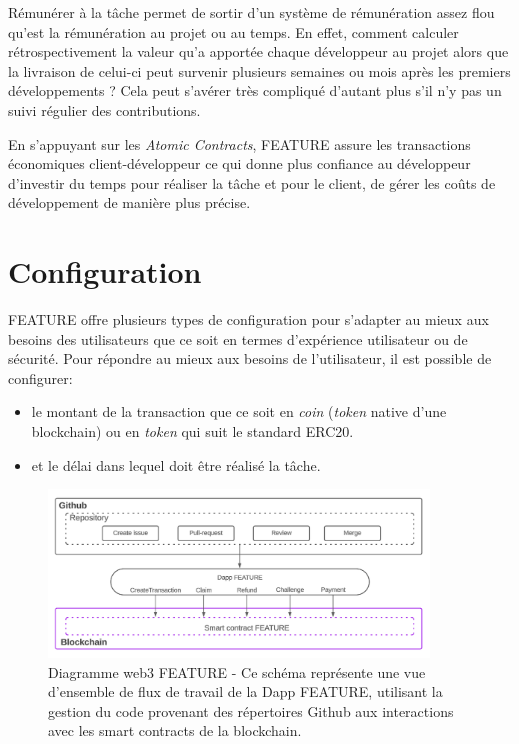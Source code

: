\documentclass[
	a4paper, %
	10pt, %
	unnumberedsections, %
	twoside, %
]{LTJournalArticle}
\begin{document}
Rémunérer à la tâche permet de sortir d'un système de rémunération assez flou qu'est la rémunération au projet ou au temps. En effet, comment calculer rétrospectivement la valeur qu'a apportée chaque développeur au projet alors que la livraison de celui-ci peut survenir plusieurs semaines ou mois après les premiers développements ? Cela peut s'avérer très compliqué d'autant plus s'il n'y pas un suivi régulier des contributions.

En s'appuyant sur les \emph{Atomic Contracts}, FEATURE assure les transactions économiques client-développeur ce qui donne plus confiance au développeur d'investir du temps pour réaliser la tâche et pour le client, de gérer les coûts de développement de manière plus précise.

\section{Configuration}

FEATURE offre plusieurs types de configuration pour s'adapter au mieux aux besoins des utilisateurs que ce soit en termes d'expérience utilisateur ou de sécurité. Pour répondre au mieux aux besoins de l'utilisateur, il est possible de configurer:

\begin{itemize}
\item
  le montant de la transaction que ce soit en \emph{coin} (\emph{token} native d'une blockchain) ou en \emph{token} qui suit le standard ERC20.
\item
  et le délai dans lequel doit être réalisé la tâche.
\end{itemize}

\begin{figure}[ht]
  \centering
  \includegraphics[width=0.9\textwidth]{media/diagram_web3_Feature.png}
  \caption{Diagramme web3 FEATURE - Ce schéma représente une vue d'ensemble de flux de travail de la Dapp FEATURE, utilisant la gestion du code provenant des répertoires Github aux interactions avec les smart contracts de la blockchain.}
  \label{fig:web3 diagram}
\end{figure}
\end{document}
